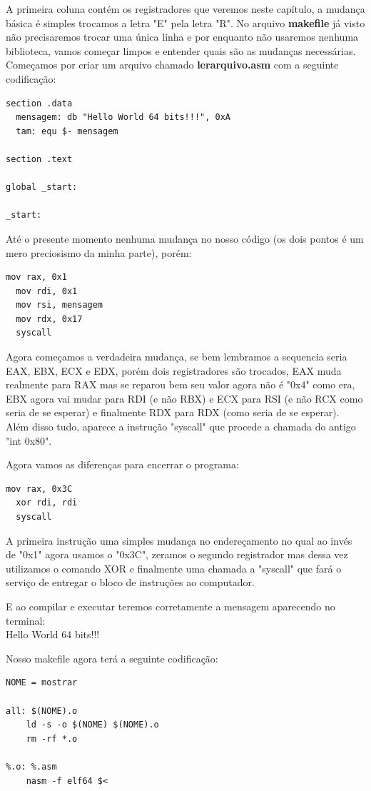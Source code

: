 A primeira coluna contém os registradores que veremos neste capítulo, a mudança básica é simples trocamos a letra "E" pela letra "R". No arquivo \textbf{makefile} já visto não precisaremos trocar uma única linha e por enquanto não usaremos nenhuma biblioteca, vamos começar limpos e entender quais são as mudanças necessárias. Começamos por criar um arquivo chamado \textbf{lerarquivo.asm} com a seguinte codificação:
\begin{lstlisting}[]
section .data
  mensagem: db "Hello World 64 bits!!!", 0xA
  tam: equ $- mensagem

section .text

global _start:

_start:
\end{lstlisting}	

Até o presente momento nenhuma mudança no nosso código (os dois pontos é um mero preciosismo da minha parte), porém:
\begin{lstlisting}[]
  mov rax, 0x1
  mov rdi, 0x1
  mov rsi, mensagem
  mov rdx, 0x17
  syscall
\end{lstlisting}

Agora começamos a verdadeira mudança, se bem lembramos a sequencia seria EAX, EBX, ECX e EDX, porém dois registradores são trocados, EAX muda realmente para RAX mas se reparou bem seu valor agora não é "0x4" como era, EBX agora vai mudar para RDI (e não RBX) e ECX para RSI (e não RCX como seria de se esperar) e finalmente RDX para RDX (como seria de se esperar). Além disso tudo, aparece a instrução "syscall" que procede a chamada do antigo "int 0x80".

Agora vamos as diferenças para encerrar o programa:
\begin{lstlisting}[]
  mov rax, 0x3C
  xor rdi, rdi
  syscall
\end{lstlisting}	

A primeira instrução uma simples mudança no endereçamento no qual ao invés de "0x1" agora usamos o "0x3C", zeramos o segundo registrador mas dessa vez utilizamos o comando XOR e finalmente uma chamada a "syscall" que fará o serviço de entregar o bloco de instruções ao computador.

E ao compilar e executar teremos corretamente a mensagem aparecendo no terminal: \\
{\ttfamily Hello World 64 bits!!!}

Nosso makefile agora terá a seguinte codificação:
\begin{lstlisting}[]
NOME = mostrar

all: $(NOME).o
	ld -s -o $(NOME) $(NOME).o
	rm -rf *.o

%.o: %.asm
	nasm -f elf64 $<
\end{lstlisting}	

